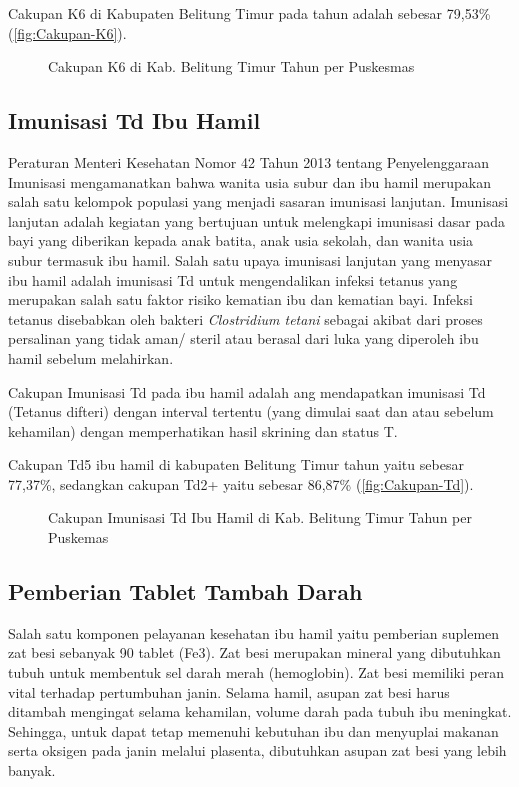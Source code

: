 Cakupan K6 di Kabupaten Belitung Timur pada tahun \tP adalah sebesar 79,53\% (\autoref{fig:Cakupan-K6}).

\begin{figure}[H]
	\centering{}
	\caption{Cakupan K6 di Kab. Belitung Timur Tahun \tP per Puskesmas}
	\label{fig:Cakupan-K6}
\end{figure}

\subsection{Imunisasi Td Ibu Hamil}
Peraturan Menteri Kesehatan Nomor 42 Tahun 2013 tentang Penyelenggaraan Imunisasi mengamanatkan bahwa wanita usia subur dan ibu hamil merupakan salah satu kelompok populasi yang menjadi sasaran imunisasi lanjutan.
Imunisasi lanjutan adalah kegiatan yang bertujuan untuk melengkapi imunisasi dasar pada bayi yang diberikan kepada anak batita, anak usia sekolah, dan wanita usia subur termasuk ibu hamil.
Salah satu upaya imunisasi lanjutan yang menyasar ibu hamil adalah imunisasi Td untuk mengendalikan infeksi tetanus yang merupakan salah satu faktor risiko kematian ibu dan kematian bayi.
Infeksi tetanus disebabkan oleh bakteri \emph{Clostridium tetani} sebagai akibat dari proses persalinan yang tidak aman/ steril atau berasal dari luka yang diperoleh ibu hamil sebelum melahirkan.

Cakupan Imunisasi Td pada ibu hamil adalah ang mendapatkan imunisasi Td (Tetanus difteri) dengan interval tertentu (yang dimulai saat dan atau sebelum kehamilan) dengan memperhatikan hasil skrining dan status T.

Cakupan Td5 ibu hamil di kabupaten Belitung Timur tahun \tP yaitu sebesar 77,37\%, sedangkan cakupan Td2+ yaitu sebesar 86,87\% (\autoref{fig:Cakupan-Td}).

\begin{figure}[H]
    \centering{}
    \caption{Cakupan Imunisasi Td Ibu Hamil di Kab. Belitung Timur Tahun \tP per Puskemas}
    \label{fig:Cakupan-Td}
\end{figure}

\subsection{Pemberian Tablet Tambah Darah}
Salah satu komponen pelayanan kesehatan ibu hamil yaitu pemberian suplemen zat besi sebanyak 90 tablet (Fe3).
Zat besi merupakan mineral yang dibutuhkan tubuh untuk membentuk sel darah merah (hemoglobin).
Zat besi memiliki peran vital terhadap pertumbuhan janin.
Selama hamil, asupan zat besi harus ditambah mengingat selama kehamilan, volume darah pada tubuh ibu meningkat.
Sehingga, untuk dapat tetap memenuhi kebutuhan ibu dan menyuplai makanan serta oksigen pada janin melalui plasenta, dibutuhkan asupan zat besi yang lebih banyak.

